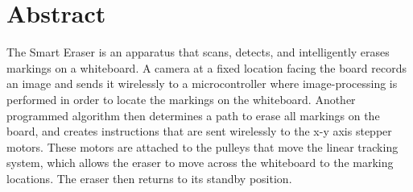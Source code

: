  \section*{Abstract}

The Smart Eraser is an apparatus that scans, detects, and intelligently erases markings on a whiteboard. A camera at a fixed location facing the board records an image and sends it wirelessly to a microcontroller where image-processing is performed in order to locate the markings on the whiteboard. Another programmed algorithm then determines a path to erase all markings on the board, and creates instructions that are sent wirelessly to the x-y axis stepper motors. These motors are attached to the pulleys that move the linear tracking system, which allows the eraser to move across the whiteboard to the marking locations. The eraser then returns to its standby position.

 \newpage
 \thispagestyle{empty}
 \tableofcontents
 \newpage
 \listoffigures
 \thispagestyle{empty}
 \newpage
 \listoftables
 
 \newpage

